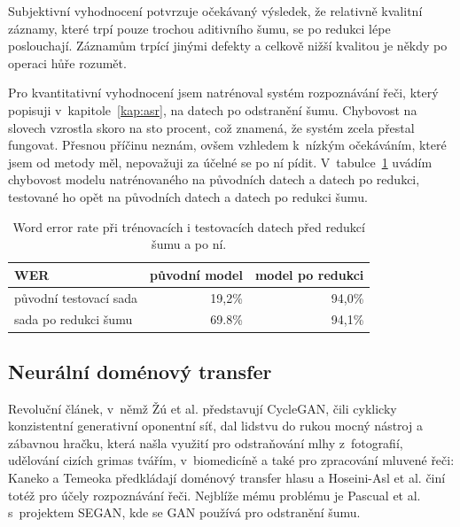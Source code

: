 Subjektivní vyhodnocení potvrzuje očekávaný výsledek, že relativně kvalitní
záznamy, které trpí pouze trochou aditivního šumu, se po redukci lépe
poslouchají. Záznamům trpící jinými defekty a celkově nižší kvalitou je někdy po
operaci hůře rozumět.

Pro kvantitativní vyhodnocení jsem natrénoval systém rozpoznávání řeči, který
popisuji v~kapitole~\ref{kap:asr}, na datech po odstranění šumu. Chybovost na
slovech vzrostla skoro na sto procent, což znamená, že systém zcela přestal
fungovat. Přesnou příčinu neznám, ovšem vzhledem k~nízkým očekáváním, které jsem
od metody měl, nepovažuji za účelné se po ní pídit.
V~tabulce~\ref{tab:results-denoise} uvádím chybovost modelu natrénovaného na
původních datech a datech po redukci, testované ho opět na původních datech a
datech po redukci šumu.

\begin{table}[htpb]
\begin{center}
\begin{tabular}{|l||r|r|}
\hline
WER    & původní model & model po redukci \\
\hline
původní testovací sada & 19,2\% & 94,0\% \\
sada po redukci šumu   & 69.8\% & 94,1\% \\
\hline
\end{tabular}
\caption{Word error rate při trénovacích i testovacích datech před redukcí šumu
a po ní.}\label{tab:results-denoise}
\end{center}
\end{table}

\subsection{Neurální doménový transfer}

Revoluční článek\cite{cyclegan}, v~němž Žú et al. představují CycleGAN, čili
cyklicky konzistentní generativní oponentní síť, dal lidstvu do rukou mocný
nástroj a zábavnou hračku, která našla využití pro odstraňování mlhy
z~fotografií\cite{Engin_2018_CVPR_Workshops}, udělování cizích grimas
tvářím\cite{jin2017faceoff}, v~biomedicíně\cite{yang2018biogan} a také pro
zpracování mluvené řeči: Kaneko a Temeoka\cite{kaneko2017parallel} předkládají
doménový transfer hlasu a Hoseini-Asl et al.\cite{hosseini2018malevoicegan} činí
totéž pro účely rozpoznávání řeči. Nejblíže mému problému je Pascual et al.
s~projektem SEGAN\cite{pascual2017segan}, kde se GAN používá pro odstranění
šumu.

